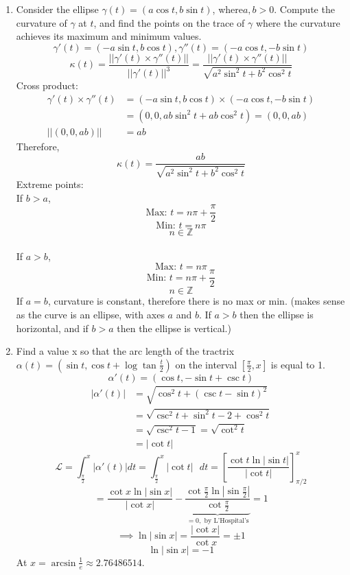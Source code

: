 \documentclass[a4paper,17pt]{extarticle}
\title{\scalebox{2}{Math 553 Exam 1}}
\author{\scalebox{1.5}{Theo Koss}}
\date{March 2022}
\theoremstyle{definition}
\renewcommand{\L}{\mathcal{L}}
\newcommand{\Z}{\mathbb{Z}}
\begin{document}
\maketitle
\begin{enumerate}
    \item Consider the ellipse $\gamma(t) = (a\cos t,b\sin t)$, where\newline $a,b > 0$. Compute the curvature of $\gamma$ at $t$, and find the points on the trace of $\gamma$ where the curvature achieves its maximum and minimum values.  $$\gamma'(t)=(-a\sin t,b\cos t),\gamma''(t)=(-a\cos t,-b\sin t)$$ $$\kappa(t)=\frac{||\gamma'(t)\times\gamma''(t)||}{||\gamma'(t)||^3}=\frac{||\gamma'(t)\times\gamma''(t)||}{\sqrt{a^2\sin^2t+b^2\cos^2t}}$$ Cross product: \begin{align*}
        \gamma'(t)\times\gamma''(t) & =(-a\sin t,b\cos t)\times(-a\cos t,-b\sin t)\\
        & =(0,0,ab\sin^2t+ab\cos^2t)=(0,0,ab)\\
        ||(0,0,ab)|| & = ab
    \end{align*}
    Therefore, $$\kappa(t)=\frac{ab}{\sqrt{a^2\sin^2t+b^2\cos^2t}}$$ Extreme points:\\If $b>a$, $$\text{Max: }t=n\pi+\frac{\pi}{2}$$ $$\text{Min: }t=n\pi$$ $$n\in\Z$$\\If $a>b$,$$\text{Max: }t=n\pi$$ $$\text{Min: }t=n\pi+\frac{\pi}{2}$$ $$n\in\Z$$ If $a=b$, curvature is constant, therefore there is no max or min. (makes sense as the curve is an ellipse, with axes $a$ and $b$. If $a>b$ then the ellipse is horizontal, and if $b>a$ then the ellipse is vertical.)
    \item Find a value x so that the arc length of the tractrix $\alpha(t) = (\sin t,\cos t + \log\tan\frac{t}{2})$ on the
interval $[\frac{\pi}{2},x]$ is equal to 1. $$\alpha'(t)=\left(\cos t,-\sin t+\csc t\right)$$ \begin{align*}
    |\alpha'(t)|& =\sqrt{\cos^2t+(\csc t-\sin t)^2}\\&=\sqrt{\csc^2t+\sin^2t-2+\cos^2t}\\&=\sqrt{\csc^2t-1}=\sqrt{\cot^2t}\\&=|\cot t|
\end{align*}$$\L=\int_{\frac{\pi}{2}}^x|\alpha'(t)|dt=\int_{\frac{\pi}{2}}^x|\cot t|\text{ }dt=\left[\frac{\cot t\ln|\sin t|}{|\cot t|}\right]_{\pi/2}^x$$ $$=\frac{\cot x\ln|\sin x|}{|\cot x|}-\underbrace{\frac{\cot\frac{\pi}{2}\ln|\sin\frac{\pi}{2}|}{\cot\frac{\pi}{2}}}_{=0,\text{ by L'Hospital's}}=1$$ $$\implies \ln|\sin x|=\frac{|\cot x|}{\cot x}=\pm 1$$ $$\ln|\sin x|=-1$$ At $x=\arcsin{\frac{1}{e}}\approx2.76486514$.

\end{enumerate}
\end{document}

